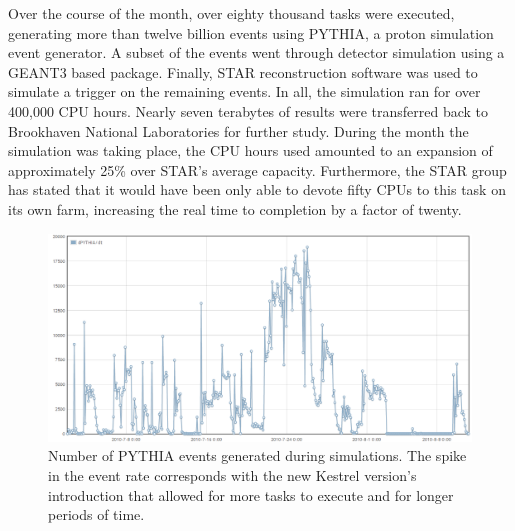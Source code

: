 Over the course of the month, over eighty thousand tasks were executed,
generating more than twelve billion events using PYTHIA, a proton
simulation event generator. A subset of the events went through detector
simulation using a GEANT3 based package. Finally, STAR reconstruction
software was used to simulate a trigger on the remaining events. In
all, the simulation ran for over 400,000 CPU hours. Nearly seven terabytes
of results were transferred back to Brookhaven National Laboratories
for further study. During the month the simulation was taking place,
the CPU hours used amounted to an expansion of approximately 25\%
over STAR's average capacity. Furthermore, the STAR group has stated
that it would have been only able to devote fifty CPUs to this task
on its own farm, increasing the real time to completion by a factor
of twenty.

%
\begin{figure}
\includegraphics[width=\columnwidth]{figures/dpythia_dt}
\caption{\label{fig:PYTHIA-Events} Number of PYTHIA events generated during
simulations. The spike in the event rate corresponds with the new
Kestrel version's introduction that allowed for more tasks to execute
and for longer periods of time.}
\end{figure}

